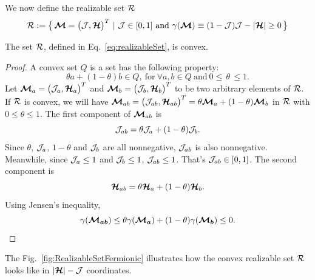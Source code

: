 We now define the realizable set $\mathcal{R}$
\begin{equation}
  \mathcal{R}:=\big\{\,\boldsymbol{\mathcal{M}}=\big(\mathcal{J},\boldsymbol{\mathcal{H}}\big)^{T}~|~\mathcal{J}\in[0,1]~\text{and}~\gamma(\boldsymbol{\mathcal{M}})\equiv(1-\mathcal{J})\mathcal{J}-|\boldsymbol{\mathcal{H}}|\ge0\,\big\}
  \label{eq:realizableSet}
\end{equation}

\begin{lemma}
  The set $\mathcal{R}$, defined in Eq.~\eqref{eq:realizableSet}, is convex.  
\end{lemma}
\begin{proof}
  A convex set $Q$ is a set has the following property: 
  \begin{equation*}
  \theta a + (1-\theta)b \in Q,~\text{for}~\forall a, b \in Q~\text{and}~0\leq\,\theta\,\leq1. 
  \end{equation*} 
  Let $\boldsymbol{\mathcal{M}}_{a}=\big(\mathcal{J}_{a},\boldsymbol{\mathcal{H}}_{a}\big)^{T}$ and $\boldsymbol{\mathcal{M}}_{b}=\big(\mathcal{J}_{b},\boldsymbol{\mathcal{H}}_{b}\big)^{T}$ to be two arbitrary elements of $\mathcal{R}$.
  If $\mathcal{R}$ is convex, we will have $\boldsymbol{\mathcal{M}}_{ab} = \big(\mathcal{J}_{ab},\boldsymbol{\mathcal{H}}_{ab}\big)^{T} = \theta \boldsymbol{\mathcal{M}}_{a} + (1-\theta)\boldsymbol{\mathcal{M}}_{b}$ in $\mathcal{R}$ with $0\leq\theta\leq1$.
  The first component of $\boldsymbol{\mathcal{M}}_{ab}$ is
  \begin{equation*}
  \mathcal{J}_{ab} = \theta \mathcal{J}_{a} + (1-\theta)\mathcal{J}_{b}.
  \end{equation*}
  Since $\theta$, $\mathcal{J}_{a}$, $1-\theta$ and $\mathcal{J}_{b}$ are all nonnegative, $\mathcal{J}_{ab}$ is also nonnegative.
  Meanwhile, since $\mathcal{J}_{a}\leq1$ and $\mathcal{J}_{b}\leq1$, $\mathcal{J}_{ab}\leq1$.
  That's $\mathcal{J}_{ab} \in [0,1]$.
  The second component is
  \begin{equation*}
  \boldsymbol{\mathcal{H}}_{ab} 
  = \theta \boldsymbol{\mathcal{H}}_{a} + (1-\theta)\boldsymbol{\mathcal{H}}_{b}.
  \end{equation*}
  Using Jensen's inequality,
  \begin{equation*}
  \gamma(\boldsymbol{\mathcal{M}_{ab}}) \leq \theta\gamma(\boldsymbol{\mathcal{M}_{a}}) + (1-\theta)\gamma(\boldsymbol{\mathcal{M}_{b}}) \leq 0.
  \end{equation*}
\end{proof}
The Fig.~\ref{fig:RealizableSetFermionic} illustrates how the convex realizable set $\mathcal{R}$ looks like in $|\boldsymbol{\mathcal{H}}| - \mathcal{J}$ coordinates.  
